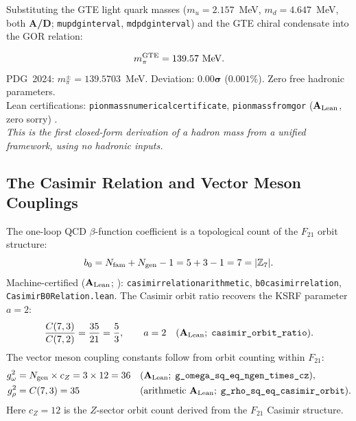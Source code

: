 \documentclass[11pt,openany]{book}
\theoremstyle{remark}
\newcommand{\ZS}{\mathbb{Z}_7}
\newcommand{\lean}[1]{%
  \penalty-100
  \begingroup\def\_{\textunderscore\allowbreak}\texttt{#1}\endgroup}
\newcommand{\Ngen}{N_{\rm gen}}
\newcommand{\Nfam}{N_{\rm fam}}
\newcommand{\CatAL}{\ensuremath{\textbf{A}_{\rm Lean}}}
\newcommand{\CatAD}{\textbf{A/D}}
\begin{document}
Substituting the GTE light quark masses ($m_u = 2.157$~MeV, $m_d = 4.647$~MeV, both
\CatAD; \lean{m\_u\_pdg\_interval}, \lean{m\_d\_pdg\_interval})
and the GTE chiral condensate into the GOR relation:

\begin{tcolorbox}[colback=orange!5,colframe=orange!60,title={Headline Result: Pion Mass (\CatAL)}]
\[
  m_\pi^{\rm GTE} = 139.57~\text{MeV}.
\]
PDG~2024: $m_\pi^\pm = 139.5703$~MeV.  Deviation: $\mathbf{0.00\sigma}$ ($0.001\%$).
Zero free hadronic parameters.\\[2pt]
Lean certifications: \lean{pion\_mass\_numerical\_certificate},
\lean{pion\_mass\_from\_gor} (\CatAL, zero sorry)
\cite{SpivackGTEQCDStructure,SpivackThreeTapeCMCA}.\\[2pt]
\emph{This is the first closed-form derivation of a hadron mass from a unified
framework, using no hadronic inputs.}
\end{tcolorbox}

\subsection*{The Casimir Relation and Vector Meson Couplings}

The one-loop QCD $\beta$-function coefficient is a topological count of the $F_{21}$
orbit structure:
\begin{equation}
  b_0 = \Nfam + \Ngen - 1 = 5 + 3 - 1 = 7 = |\ZS|.
  \label{eq:casimir}
\end{equation}
Machine-certified (\CatAL; \cite{SpivackGTEQCDStructure}):
\lean{casimir\_relation\_arithmetic}, \lean{b0\_casimir\_relation},
\lean{CasimirB0Relation.lean}.  The Casimir
orbit ratio recovers the KSRF parameter $a=2$:
\begin{equation}
  \frac{C(7,3)}{C(7,2)} = \frac{35}{21} = \frac{5}{3}, \qquad a = 2
  \quad (\CatAL;\;\lean{casimir\_orbit\_ratio}).
  \label{eq:casimir_ratio}
\end{equation}
The vector meson coupling constants follow from orbit counting within $F_{21}$:
\begin{align}
  g_\omega^2 &= \Ngen \times c_Z = 3 \times 12 = 36
    && (\CatAL;\;\lean{g\_omega\_sq\_eq\_ngen\_times\_cz}),
    \label{eq:g_omega}\\
  g_\rho^2 &= C(7,3) = 35
    && (\text{arithmetic \CatAL};\;\lean{g\_rho\_sq\_eq\_casimir\_orbit}).
    \label{eq:g_rho}
\end{align}
Here $c_Z = 12$ is the $Z$-sector orbit count derived from the $F_{21}$ Casimir
structure.
\end{document}
